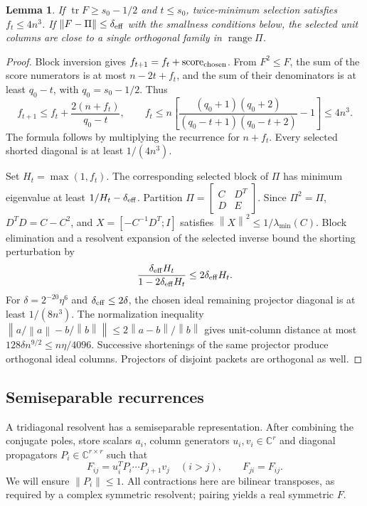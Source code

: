 \documentclass[11pt]{article}
\newtheorem{lemma}[theorem]{Lemma}
\theoremstyle{remark}\newtheorem{remark}[theorem]{Remark}
\newcommand{\norm}[1]{\left\lVert#1\right\rVert}
\newcommand{\tr}{\operatorname{tr}}
\newcommand{\C}{\mathbb C}
\begin{document}
\begin{lemma}\label{lem:selection}
If $\tr F\ge s_0-1/2$ and $t\le s_0$, twice-minimum selection satisfies
$f_t\le4n^3$. If $\norm{F-\Pi}\le\delta_{\rm eff}$ with the smallness
conditions below, the selected unit columns are close to a single orthogonal
family in $\operatorname{range}\Pi$.
\end{lemma}
\begin{proof}
Block inversion gives $f_{t+1}=f_t+\mathrm{score}_{\rm chosen}$.
From $F^2\le F$, the sum of the score numerators is at most $n-2t+f_t$,
and the sum of their denominators is at least $q_0-t$, with $q_0=s_0-1/2$.
Thus
\[
 f_{t+1}\le f_t+\frac{2(n+f_t)}{q_0-t},\qquad
 f_t\le n\left[
 \frac{(q_0+1)(q_0+2)}{(q_0-t+1)(q_0-t+2)}-1\right]\le4n^3.
\]
The formula follows by multiplying the recurrence for $n+f_t$.
Every selected shorted diagonal is at least $1/(4n^3)$.

Set $H_t=\max(1,f_t)$. The corresponding selected block of $\Pi$ has
minimum eigenvalue at least $1/H_t-\delta_{\rm eff}$. Partition
$\Pi=\left[\begin{smallmatrix}C&D^T\\D&E\end{smallmatrix}\right]$.
Since $\Pi^2=\Pi$, $D^TD=C-C^2$, and
$X=[-C^{-1}D^T;I]$ satisfies $\norm X^2\le1/\lambda_{\min}(C)$.
Block elimination and a resolvent expansion of the selected inverse bound
the shorting perturbation by
\[
 \frac{\delta_{\rm eff}H_t}{1-2\delta_{\rm eff}H_t}
 \le2\delta_{\rm eff}H_t.
\]
For $\delta=2^{-20}\eta^6$ and $\delta_{\rm eff}\le2\delta$, the chosen
ideal remaining projector diagonal is at least $1/(8n^3)$. The normalization
inequality
$\norm{a/\norm a-b/\norm b}\le2\norm{a-b}/\norm b$ gives unit-column
distance at most $128\delta n^{9/2}\le n\eta/4096$.
Successive shortenings of the same projector produce orthogonal ideal
columns. Projectors of disjoint packets are orthogonal as well.
\end{proof}

\subsection{Semiseparable recurrences}
A tridiagonal resolvent has a semiseparable representation. After combining
the conjugate poles, store scalars $a_i$, column generators
$u_i,v_i\in\C^r$ and diagonal propagators $P_i\in\C^{r\times r}$ such that
\begin{equation}\label{eq:ss}
 F_{ij}=u_i^TP_i\cdots P_{j+1}v_j\quad(i>j),\qquad F_{ji}=F_{ij}.
\end{equation}
We will ensure $\norm{P_i}\le1$. All contractions here are bilinear
transposes, as required by a complex symmetric resolvent; pairing yields a
real symmetric $F$.
\end{document}
